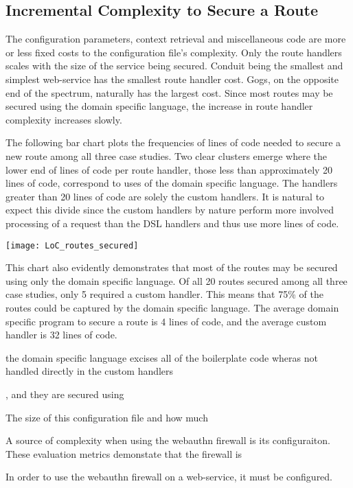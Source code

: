 \subsection{Incremental Complexity to Secure a Route}

The configuration parameters, context retrieval and miscellaneous code are more or less fixed costs to the configuration file's complexity. Only the route handlers scales with the size of the service being secured. Conduit being the smallest and simplest web-service has the smallest route handler cost. Gogs, on the opposite end of the spectrum, naturally has the largest cost. Since most routes may be secured using the domain specific language, the increase in route handler complexity increases slowly.

The following bar chart plots the frequencies of lines of code needed to secure a new route among all three case studies. Two clear clusters emerge where the lower end of lines of code per route handler, those less than approximately 20 lines of code, correspond to uses of the domain specific language. The handlers greater than 20 lines of code are solely the custom handlers. It is natural to expect this divide since the custom handlers by nature perform more involved processing of a request than the DSL handlers and thus use more lines of code.

\begin{center}
\texttt{[image: LoC\_routes\_secured]}
\end{center}

This chart also evidently demonstrates that most of the routes may be secured using only the domain specific language. Of all 20 routes secured among all three case studies, only 5 required a custom handler. This means that 75\% of the routes could be captured by the domain specific language. The average domain specific program to secure a route is 4 lines of code, and the average custom handler is 32 lines of code.

\iffalse
 the domain specific language excises all of the boilerplate code wheras not handled directly in the custom handlers

, and they are secured using

The size of this configuration file and how much

A source of complexity when using the webauthn firewall is its configuraiton. These evaluation metrics demonstate that the firewall is 

In order to use the webauthn firewall on a web-service, it must be configured. 

